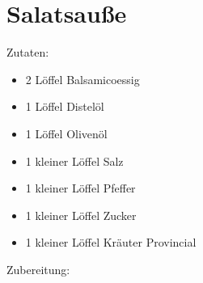 \section{Salatsauße}

Zutaten:

\begin{itemize}
    \item 2 Löffel Balsamicoessig
	\item 1 Löffel Distelöl
	\item 1 Löffel Olivenöl
	\item 1 kleiner Löffel Salz
	\item 1 kleiner Löffel Pfeffer
	\item 1 kleiner Löffel Zucker
	\item 1 kleiner Löffel Kräuter Provincial
\end{itemize}

\noindent Zubereitung:

\noindent


\newpage
\mbox{}
\vfill
\begin{center}
\end{center}
\vfill
\mbox{ }
\newpage
